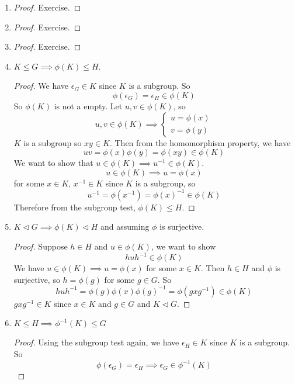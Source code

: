 \documentclass[openany]{report}
\begin{document}
\begin{enumerate}[label=(\alph*)]
    \item \begin{proof}
        Exercise.
    \end{proof}
    \item \begin{proof}
        Exercise.
    \end{proof}
    \item \begin{proof}
        Exercise.
    \end{proof}
    \item $K \leq G \implies \phi(K) \leq H$. \begin{proof}
        We have $\epsilon_G \in K$ since $K$ is a subgroup. So 
        $$\phi(\epsilon_G) = \epsilon_H \in \phi(K)$$
        So $\phi(K)$ is not a empty. Let $u,v \in \phi(K)$, so
        \[u,v \in \phi(K) \implies \begin{cases}
            u = \phi(x)\\
            v = \phi(y)
        \end{cases} \]
        $K$ is a subgroup so $xy \in K$. Then from the homomorphism property, we have
        \[uv = \phi(x)\phi(y) = \phi(xy) \in \phi(K)\]
        We want to show that $u \in \phi(K) \implies u^{-1} \in \phi(K)$. 
        \[u \in \phi(K) \implies u = \phi(x)\]
        for some $x \in K$, $x^{-1} \in K$ since $K$ is a subgroup, so 
        \[u^{-1} = \phi(x^{-1}) = \phi(x)^{-1} \in \phi(K)\]
        Therefore from the subgroup test, $\phi(K) \leq H$.  
    \end{proof}
    \item $K \triangleleft G \implies \phi(K) \triangleleft H$ and assuming $\phi$ is surjective. 
    \begin{proof}
        Suppose $h \in H$ and $u \in \phi(K)$, we want to show 
        \[huh^{-1} \in \phi(K)\]
        We have $u \in \phi(K) \implies u = \phi(x)$ for some $x \in K$. Then $h \in H$ and $\phi$ is surjective, so $h = \phi(g)$ for some $g \in G$. So
        \[huh^{-1} = \phi(g)\phi(x)\phi(g)^{-1} = \phi(gxg^{-1})\in \phi(K)\]
        $gxg^{-1} \in K$ since $x \in K$ and $g \in G$ and $K \triangleleft G$.
    \end{proof}
    \item $K \leq H \implies \phi^{-1}(K) \leq G$
    \begin{proof}
        Using the subgroup test again, we have $\epsilon_H \in K$ since $K$ is a subgroup. So 
        \[\phi(\epsilon_G) = \epsilon_H \implies \epsilon_G \in \phi^{-1}(K)\]

\end{proof}
\end{enumerate}
\end{document}
